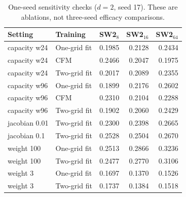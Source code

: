 \begin{table}[ht]
\centering
\caption{One-seed sensitivity checks ($d=2$, seed 17). These are ablations, not three-seed efficacy comparisons.}
\label{tab:ablations-new}
\begin{tabular}{@{}llrrr@{}}
\toprule
Setting & Training & SW2$_8$ & SW2$_{16}$ & SW2$_{64}$\\
\midrule
capacity w24 & One-grid fit & 0.1985 & 0.2128 & 0.2434\\
capacity w24 & CFM & 0.2466 & 0.2047 & 0.1975\\
capacity w24 & Two-grid fit & 0.2017 & 0.2089 & 0.2355\\
capacity w96 & One-grid fit & 0.1899 & 0.2176 & 0.2602\\
capacity w96 & CFM & 0.2310 & 0.2104 & 0.2288\\
capacity w96 & Two-grid fit & 0.1902 & 0.2060 & 0.2429\\
jacobian 0.01 & Two-grid fit & 0.2300 & 0.2398 & 0.2665\\
jacobian 0.1 & Two-grid fit & 0.2528 & 0.2504 & 0.2670\\
weight 100 & One-grid fit & 0.2513 & 0.2866 & 0.3236\\
weight 100 & Two-grid fit & 0.2477 & 0.2770 & 0.3106\\
weight 3 & One-grid fit & 0.1697 & 0.1370 & 0.1526\\
weight 3 & Two-grid fit & 0.1737 & 0.1384 & 0.1518\\
\bottomrule
\end{tabular}
\end{table}
